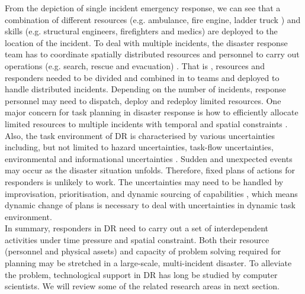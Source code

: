 From the depiction of single incident emergency response, we can see that a combination of different resources (e.g. ambulance, fire engine, ladder truck ) and skills (e.g. structural engineers, firefighters and medics) are deployed to the location of the incident. To deal with multiple incidents, the disaster response team has to coordinate spatially distributed resources and personnel to carry out operations (e.g. search, rescue and evacuation) \cite{Chen2005}. That is , resources and responders needed to be divided and combined in to teams and deployed to handle distributed incidents. Depending on the number of incidents, response personnel may need to dispatch, deploy and redeploy limited resources. One major concern for task planning in disaster response is how to efficiently allocate limited resources to multiple incidents with temporal and spatial constraints \cite{Bradshaw2011}.\\

Also, the task environment of \ac{DR} is characterised by various uncertainties including, but not limited to hazard uncertainties, task-flow uncertainties, environmental and informational uncertainties \cite{Chen2008}. Sudden and unexpected events may occur as the disaster situation unfolds. Therefore, fixed plans of actions for responders is unlikely to work. The uncertainties may need to be handled by improvisation, prioritisation, and dynamic sourcing of capabilities \cite{Faraj2006}, which means dynamic change of plans is necessary to deal with uncertainties in dynamic task environment.\\   

In summary, responders in \ac{DR} need to carry out a set of interdependent activities under time pressure and spatial constraint. Both their resource (personnel and physical assets) and capacity of problem solving required for planning may be stretched in a large-scale, multi-incident disaster. To alleviate the problem, technological support in \ac{DR} has long be studied by computer scientists. We will review some of the related research areas in next section.\\




